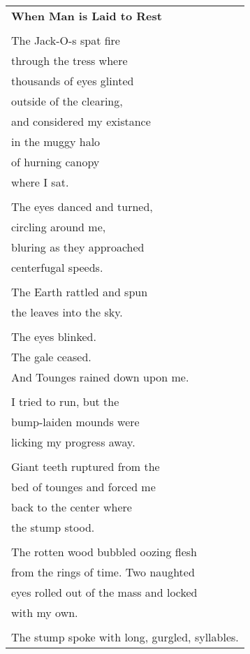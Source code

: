 \documentclass{article}
\begin{document}
\begin{center}
\begin{tabular}{l}
\textbf{When Man is Laid to Rest} \\
\\
The Jack-O-s spat fire \\
through the tress where \\
thousands of eyes glinted \\
outside of the clearing, \\
and considered my existance \\
in the muggy halo \\
of hurning canopy \\
where I sat. \\
\\
The eyes danced and turned, \\
circling around me, \\
bluring as they approached \\
centerfugal speeds. \\
\\
The Earth rattled and spun \\
the leaves into the sky. \\
\\
The eyes blinked. \\
The gale ceased. \\
And Tounges rained down upon me. \\
\\
I tried to run, but the \\
bump-laiden mounds were \\
licking my progress away. \\
\\
Giant teeth ruptured from the \\
bed of tounges and forced me \\
back to the center where \\
the stump stood. \\
\\
The rotten wood bubbled oozing flesh \\
from the rings of time.  Two naughted \\
eyes rolled out of the mass and locked \\
with my own. \\
\\
The stump spoke with long, gurgled, syllables. \\ %
\end{tabular}
\begin{tabular}{l}

\end{tabular}
\end{center}
\end{document}
